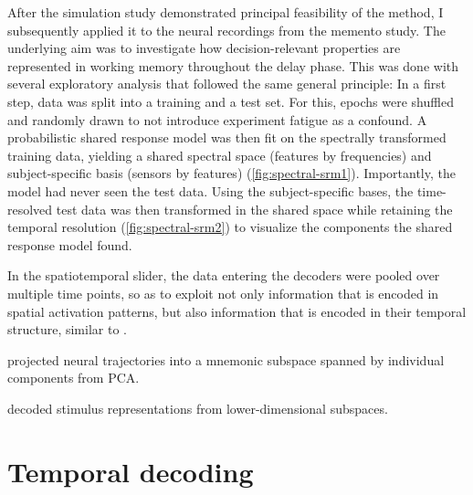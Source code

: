After the simulation study demonstrated principal feasibility of the method, I subsequently applied it to the neural recordings from the memento study.
The underlying aim was to investigate how decision-relevant properties are represented in working memory throughout the delay phase.
This was done with several exploratory analysis that followed the same general principle:
In a first step, data was split into a training and a test set.
For this, epochs were shuffled and randomly drawn to not introduce experiment fatigue as a confound.
A probabilistic shared response model was then fit on the spectrally transformed training data, yielding a shared spectral space (features by frequencies) and subject-specific basis (sensors by features) (\ref{fig:spectral-srm1}).
Importantly, the model had never seen the test data.
Using the subject-specific bases, the time-resolved test data was then transformed in the shared space while retaining the temporal resolution (\ref{fig:spectral-srm2}) to visualize the components the shared response model found.



In the spatiotemporal slider, the data entering the decoders were pooled over multiple time points, so as to exploit not only information that is encoded in spatial activation patterns, but also information that is encoded in their temporal structure, similar to \citep{muhle2021hierarchy}.


\citet{murray2017stable} projected neural trajectories into a mnemonic subspace spanned by individual components from PCA.

\citet{murray2017stable} decoded stimulus representations from lower-dimensional subspaces.

\pagebreak

\section{Temporal decoding}

